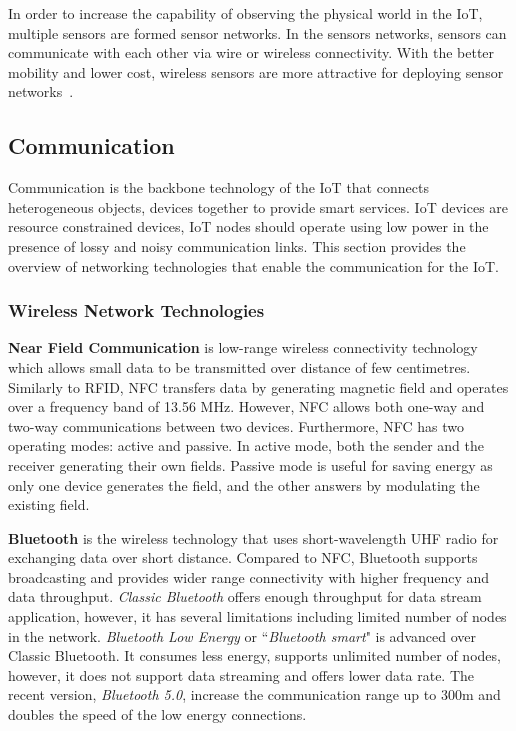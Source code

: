 In order to increase the capability of observing the physical world in the IoT, multiple sensors are formed sensor networks.
In the sensors networks, sensors can communicate with each other via wire or wireless connectivity. 
With the better mobility and lower cost, wireless sensors are more attractive for deploying sensor networks~\citep{Sheng:2015}.


\subsection{Communication}

Communication is the backbone technology of the IoT that connects heterogeneous objects, devices together to provide smart services. 
IoT devices are resource constrained devices, IoT nodes should operate using low power in the presence of lossy and noisy communication links.
This section provides the overview of networking technologies that enable the communication for the IoT.


\subsubsection{Wireless Network Technologies}


\textbf{Near Field Communication} is low-range wireless connectivity technology which allows small data to be transmitted over distance of few centimetres. 
Similarly to RFID, NFC transfers data by generating magnetic field and operates over a frequency band of 13.56 MHz.
However, NFC allows both one-way and two-way communications between two devices.
Furthermore, NFC has two operating modes: active and passive.
In active mode, both the sender and the receiver  generating their own fields.
Passive mode is useful for saving energy as only one device generates the field, and the other answers by modulating the existing field.

\textbf{Bluetooth} is the wireless technology that uses short-wavelength UHF radio for exchanging data over short distance.
Compared to NFC, Bluetooth supports broadcasting and provides wider range connectivity with higher frequency and data throughput. 
\textit{Classic Bluetooth} offers enough throughput for data stream application, however, it has several limitations including limited number of nodes in the network.
\textit{Bluetooth Low Energy} or ``\textit{Bluetooth smart}" is advanced over Classic Bluetooth.
It consumes less energy, supports unlimited number of nodes, however, it does not support data streaming and offers lower data rate.
The recent version, \textit{Bluetooth 5.0}, increase the communication range up to 300m and doubles the speed of the low energy connections. 

